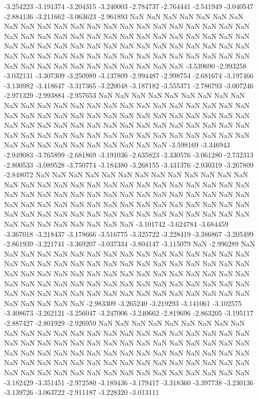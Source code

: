 -3.254223
-3.191374
-3.204315
-3.240003
-2.784737
-2.764441
-2.541949
-3.040547
-2.884136
-3.211662
-3.063623
-2.961893
NaN
NaN
NaN
NaN
NaN
NaN
NaN
NaN
NaN
NaN
NaN
NaN
NaN
NaN
NaN
NaN
NaN
NaN
NaN
NaN
NaN
NaN
NaN
NaN
NaN
NaN
NaN
NaN
NaN
NaN
NaN
NaN
NaN
NaN
NaN
NaN
NaN
NaN
NaN
NaN
NaN
NaN
NaN
NaN
NaN
NaN
NaN
NaN
NaN
NaN
NaN
NaN
NaN
NaN
NaN
NaN
NaN
NaN
NaN
NaN
NaN
NaN
NaN
NaN
NaN
NaN
NaN
NaN
NaN
NaN
NaN
NaN
NaN
NaN
NaN
NaN
NaN
NaN
-3.539690
-2.993258
-3.032131
-3.307309
-3.250989
-3.137809
-2.994487
-2.998754
-2.681674
-3.197466
-3.130982
-3.418647
-3.317365
-3.220048
-3.187182
-3.555371
-2.786793
-3.007246
-2.971329
-2.993884
-2.957653
NaN
NaN
NaN
NaN
NaN
NaN
NaN
NaN
NaN
NaN
NaN
NaN
NaN
NaN
NaN
NaN
NaN
NaN
NaN
NaN
NaN
NaN
NaN
NaN
NaN
NaN
NaN
NaN
NaN
NaN
NaN
NaN
NaN
NaN
NaN
NaN
NaN
NaN
NaN
NaN
NaN
NaN
NaN
NaN
NaN
NaN
NaN
NaN
NaN
NaN
NaN
NaN
NaN
NaN
NaN
NaN
NaN
NaN
NaN
NaN
NaN
NaN
NaN
NaN
NaN
NaN
NaN
NaN
NaN
NaN
NaN
NaN
NaN
NaN
NaN
NaN
NaN
NaN
NaN
-3.598169
-3.346943
-2.949083
-3.765899
-2.681869
-3.191036
-2.635823
-3.330576
-3.061280
-2.732313
-2.800533
-3.089528
-3.750774
-3.184380
-3.268155
-3.431376
-2.930319
-3.267809
-2.848072
NaN
NaN
NaN
NaN
NaN
NaN
NaN
NaN
NaN
NaN
NaN
NaN
NaN
NaN
NaN
NaN
NaN
NaN
NaN
NaN
NaN
NaN
NaN
NaN
NaN
NaN
NaN
NaN
NaN
NaN
NaN
NaN
NaN
NaN
NaN
NaN
NaN
NaN
NaN
NaN
NaN
NaN
NaN
NaN
NaN
NaN
NaN
NaN
NaN
NaN
NaN
NaN
NaN
NaN
NaN
NaN
NaN
NaN
NaN
NaN
NaN
NaN
NaN
NaN
NaN
NaN
NaN
NaN
NaN
NaN
NaN
NaN
NaN
NaN
NaN
NaN
NaN
NaN
NaN
NaN
NaN
-3.101742
-3.624784
-3.684459
-3.367018
-3.218437
-3.178666
-3.516775
-3.325722
-3.228419
-3.386867
-3.205499
-2.861939
-3.221741
-3.369207
-3.037334
-3.804147
-3.115079
NaN
-2.996289
NaN
NaN
NaN
NaN
NaN
NaN
NaN
NaN
NaN
NaN
NaN
NaN
NaN
NaN
NaN
NaN
NaN
NaN
NaN
NaN
NaN
NaN
NaN
NaN
NaN
NaN
NaN
NaN
NaN
NaN
NaN
NaN
NaN
NaN
NaN
NaN
NaN
NaN
NaN
NaN
NaN
NaN
NaN
NaN
NaN
NaN
NaN
NaN
NaN
NaN
NaN
NaN
NaN
NaN
NaN
NaN
NaN
NaN
NaN
NaN
NaN
NaN
NaN
NaN
NaN
NaN
NaN
NaN
NaN
NaN
NaN
NaN
NaN
NaN
NaN
NaN
NaN
NaN
NaN
NaN
NaN
-2.983309
-3.265240
-3.219293
-3.141061
-3.102575
-3.408673
-3.262121
-3.256047
-3.247006
-3.240662
-2.819696
-2.863205
-3.195117
-2.887427
-2.801929
-2.926959
NaN
NaN
NaN
NaN
NaN
NaN
NaN
NaN
NaN
NaN
NaN
NaN
NaN
NaN
NaN
NaN
NaN
NaN
NaN
NaN
NaN
NaN
NaN
NaN
NaN
NaN
NaN
NaN
NaN
NaN
NaN
NaN
NaN
NaN
NaN
NaN
NaN
NaN
NaN
NaN
NaN
NaN
NaN
NaN
NaN
NaN
NaN
NaN
NaN
NaN
NaN
NaN
NaN
NaN
NaN
NaN
NaN
NaN
NaN
NaN
NaN
NaN
NaN
NaN
NaN
NaN
NaN
NaN
NaN
NaN
NaN
NaN
NaN
NaN
NaN
NaN
NaN
NaN
NaN
NaN
NaN
NaN
NaN
NaN
-3.182429
-3.351451
-2.972580
-3.189436
-3.179417
-3.318360
-3.397738
-3.230136
-3.139726
-3.063722
-2.911187
-3.228320
-3.013111
